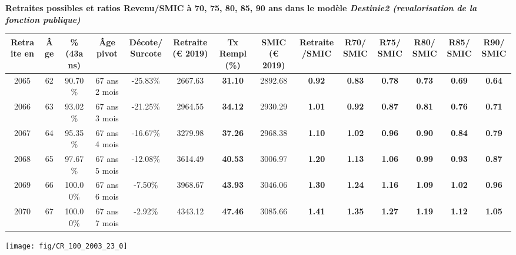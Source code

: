 \vspace{0.1cm} 
{\bf \noindent Retraites possibles et ratios Revenu/SMIC à 70, 75, 80, 85, 90 ans dans le modèle \emph{Destinie2 (revalorisation de la fonction publique)}}  
 
\begin{adjustbox}{max width=\textwidth} 
\begin{tabular}[htb]{|c|c||c|c|c||c|c||c|c||c|c|c|c|c|} 
\hline 
 Retraite en &  Âge &  \%(43ans) &  Âge pivot &  Décote/Surcote &  Retraite (\euro{} 2019) &  Tx Rempl(\%) &  SMIC (\euro{} 2019) &  Retraite/SMIC &  R70/SMIC &  R75/SMIC &  R80/SMIC &  R85/SMIC &  R90/SMIC \\ 
\hline \hline 
 2065 &  62 &  90.70\% &  67 ans 2 mois &  -25.83\% &  2667.63 &  {\bf 31.10} &  2892.68 &  {\bf {\color{red} 0.92}} &  {\bf {\color{red} 0.83}} &  {\bf {\color{red} 0.78}} &  {\bf {\color{red} 0.73}} &  {\bf {\color{red} 0.69}} &  {\bf {\color{red} 0.64}} \\ 
\hline 
 2066 &  63 &  93.02\% &  67 ans 3 mois &  -21.25\% &  2964.55 &  {\bf 34.12} &  2930.29 &  {\bf 1.01} &  {\bf {\color{red} 0.92}} &  {\bf {\color{red} 0.87}} &  {\bf {\color{red} 0.81}} &  {\bf {\color{red} 0.76}} &  {\bf {\color{red} 0.71}} \\ 
\hline 
 2067 &  64 &  95.35\% &  67 ans 4 mois &  -16.67\% &  3279.98 &  {\bf 37.26} &  2968.38 &  {\bf 1.10} &  {\bf 1.02} &  {\bf {\color{red} 0.96}} &  {\bf {\color{red} 0.90}} &  {\bf {\color{red} 0.84}} &  {\bf {\color{red} 0.79}} \\ 
\hline 
 2068 &  65 &  97.67\% &  67 ans 5 mois &  -12.08\% &  3614.49 &  {\bf 40.53} &  3006.97 &  {\bf 1.20} &  {\bf 1.13} &  {\bf 1.06} &  {\bf {\color{red} 0.99}} &  {\bf {\color{red} 0.93}} &  {\bf {\color{red} 0.87}} \\ 
\hline 
 2069 &  66 &  100.00\% &  67 ans 6 mois &  -7.50\% &  3968.67 &  {\bf 43.93} &  3046.06 &  {\bf 1.30} &  {\bf 1.24} &  {\bf 1.16} &  {\bf 1.09} &  {\bf 1.02} &  {\bf {\color{red} 0.96}} \\ 
\hline 
 2070 &  67 &  100.00\% &  67 ans 7 mois &  -2.92\% &  4343.12 &  {\bf 47.46} &  3085.66 &  {\bf 1.41} &  {\bf 1.35} &  {\bf 1.27} &  {\bf 1.19} &  {\bf 1.12} &  {\bf 1.05} \\ 
\hline 
\hline 
\end{tabular} 
\end{adjustbox} 
 
 \vspace{0.1cm} 

 {\hspace{-2.2cm}\texttt{[image: fig/CR\_100\_2003\_23\_0]}} 

